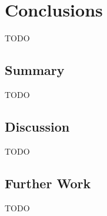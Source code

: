 \chapter{Conclusions}
\label{chap:conc}

TODO

\section{Summary}

TODO

\section{Discussion}

TODO

\section{Further Work}

TODO
